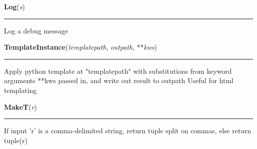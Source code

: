     \label{System:Utils:Log}

    \vspace{0.5ex}

\hspace{.8\funcindent}\begin{boxedminipage}{\funcwidth}

    \raggedright \textbf{Log}(\textit{s})

    \vspace{-1.5ex}

    \rule{\textwidth}{0.5\fboxrule}
\setlength{\parskip}{2ex}
    Log a debug message

\setlength{\parskip}{1ex}
    \end{boxedminipage}

    \label{System:Utils:TemplateInstance}

    \vspace{0.5ex}

\hspace{.8\funcindent}\begin{boxedminipage}{\funcwidth}

    \raggedright \textbf{TemplateInstance}(\textit{templatepath}, \textit{outpath}, **\textit{kws})

    \vspace{-1.5ex}

    \rule{\textwidth}{0.5\fboxrule}
\setlength{\parskip}{2ex}
    Apply python template at "templatepath" with substitutions from keyword
    arguments **kws passed in, and write out result to outpath Useful for 
    html templating

\setlength{\parskip}{1ex}
    \end{boxedminipage}

    \label{System:Utils:MakeT}

    \vspace{0.5ex}

\hspace{.8\funcindent}\begin{boxedminipage}{\funcwidth}

    \raggedright \textbf{MakeT}(\textit{r})

    \vspace{-1.5ex}

    \rule{\textwidth}{0.5\fboxrule}
\setlength{\parskip}{2ex}
    If input 'r' is a comma-delimited string, return tuple split on commas,
    else return tuple(r)

\setlength{\parskip}{1ex}
    \end{boxedminipage}

